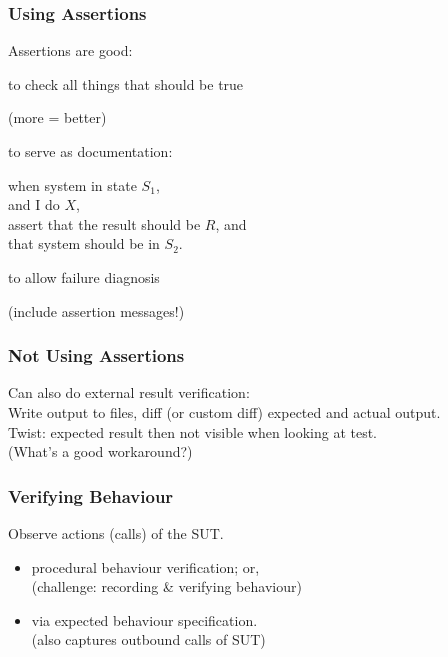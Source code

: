 \documentclass{beamer}
\newenvironment{changemargin}[1]{%
  \begin{list}{}{%
    \setlength{\topsep}{0pt}%
    \setlength{\leftmargin}{#1}%
    \setlength{\rightmargin}{1em}
    \setlength{\listparindent}{\parindent}%
    \setlength{\itemindent}{\parindent}%
    \setlength{\parsep}{\parskip}%
  }%
  \item[]}{\end{list}}
\begin{document}
\begin{frame}
  \frametitle{Using Assertions}
  \large
  \begin{changemargin}{2cm}
    Assertions are good:
    \begin{itemize}
    \item to check all things that should be true\\
      \begin{changemargin}{1cm}
        (more = better)
      \end{changemargin}
    \item to serve as documentation:
      \begin{changemargin}{1cm}
        when system in state $S_1$,\\
        and I do $X$,\\
        assert that the result should be $R$, and\\
        that system should be in $S_2$.
      \end{changemargin}
    \item to allow failure diagnosis\\
            \begin{changemargin}{1cm}
              (include assertion messages!)
            \end{changemargin}
    \end{itemize}
  \end{changemargin}
\end{frame}

\begin{frame}
  \frametitle{Not Using Assertions}
  \Large
  \begin{changemargin}{2cm}
    Can also do external result verification:\\[1em]
    Write output to files, diff (or custom diff)
    expected and actual output.\\[1em]
    Twist: expected result then not visible when looking at test.\\[1em]
    (What's a good workaround?)
  \end{changemargin}
\end{frame}

\begin{frame}
  \frametitle{Verifying Behaviour}
  \Large
  \begin{changemargin}{2cm}
    Observe actions (calls) of the SUT.
    \begin{itemize}
    \item procedural behaviour verification; or,\\
      (challenge: recording \& verifying behaviour)\\[.5em]
    \item via expected behaviour specification.\\
      (also captures outbound calls of SUT)
    \end{itemize}
  \end{changemargin}
\end{frame}
\end{document}
